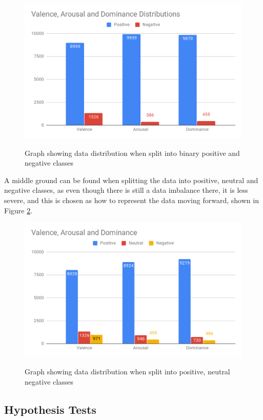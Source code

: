 \begin{figure}[ht]
\caption{Graph showing data distribution when split into binary positive and negative classes}
\centering
\includegraphics[scale=0.25]{graphs/binaryDist.png}
\label{dist:bin}
\end{figure}

A middle ground can be found when splitting the data into positive, neutral and negative classes, as even though there is still a data imbalance there, it is less severe, and this is chosen as how to represent the data moving forward, shown in Figure \ref{dist:tri}.

\begin{figure}[H]
\caption{Graph showing data distribution when split into positive, neutral negative classes}
\centering
\includegraphics[scale=0.3]{graphs/nonBinaryDist.png}
\label{dist:tri}
\end{figure}

\pagebreak


\subsection{Hypothesis Tests}

